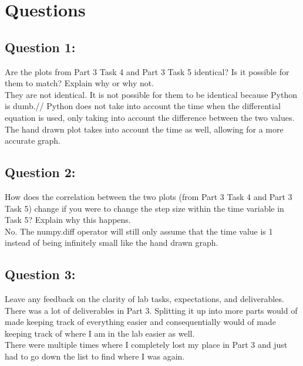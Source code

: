 \documentclass[12pt,a4paper]{article}
\begin{document}
\section{Questions}\label{sec:intro}
\subsection{Question 1:}
Are the plots from Part 3 Task 4 and Part 3 Task 5 identical? Is it possible for them to
match? Explain why or why not.\\
They are not identical. It is not possible for them to be identical because Python is dumb.//
Python does not take into account the time when the differential equation is used, only taking into account the difference between the two values. \\
The hand drawn plot takes into account the time as well, allowing for a more accurate graph.\\
\subsection{Question 2:}
How does the correlation between the two plots (from Part 3 Task 4 and Part 3 Task 5)
change if you were to change the step size within the time variable in Task 5? Explain why
this happens.\\
No. The numpy.diff operator will still only assume that the time value is 1 instead of being infinitely small like the hand drawn graph.\\
\subsection{Question 3:}
Leave any feedback on the clarity of lab tasks, expectations, and deliverables.\\
There was a lot of deliverables in Part 3. Splitting it up into more parts would of made keeping track of everything easier and consequentially would of made keeping track of where I am in the lab easier as well.\\
There were multiple times where I completely lost my place in Part 3 and just had to go down the list to find where I was again.\\


\end{document}
